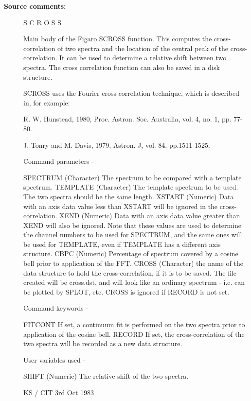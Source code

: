 \begin{description}
\item [\textbf{Source comments:}]
\begin{terminalv}
 S C R O S S

 Main body of the Figaro SCROSS function.  This computes
 the cross-correlation of two spectra and the location of the
 central peak of the cross-correlation.  It can be used to
 determine a relative shift between two spectra.  The cross
 correlation function can also be saved in a disk structure.

 SCROSS uses the Fourier cross-correlation technique, which is
 described in, for example:

   R. W. Hunstead, 1980, Proc. Astron. Soc. Australia, vol. 4, no. 1,
   pp. 77-80.

   J. Tonry and M. Davis, 1979, Astron. J, vol. 84, pp.1511-1525.

 Command parameters -

 SPECTRUM    (Character) The spectrum to be compared with
             a template spectrum.
 TEMPLATE    (Character) The template spectrum to be used.
             The two spectra should be the same length.
 XSTART      (Numeric) Data with an axis data value less than XSTART
             will be ignored in the cross-correlation.
 XEND        (Numeric) Data with an axis data value greater than XEND
             will also be ignored.  Note that these values are
             used to determine the channel numbers to be used
             for SPECTRUM, and the same ones will be used for
             TEMPLATE, even if TEMPLATE has a  different axis
             structure.
 CBPC        (Numeric) Percentage of spectrum covered by a cosine
             bell prior to application of the FFT.
 CROSS       (Character) the name of the data structure to hold
             the cross-correlation, if it is to be saved.
             The file created will be cross.dst, and will look
             like an ordinary spectrum - i.e. can be plotted by
             SPLOT, etc.  CROSS is ignored if RECORD is not
             set.

 Command keywords -

 FITCONT     If set, a continuum fit is performed on the two
             spectra prior to application of the cosine bell.
 RECORD      If set, the cross-correlation of the two spectra
             will be recorded as a new data structure.

 User variables used -

 SHIFT       (Numeric) The relative shift of the two spectra.

                                         KS / CIT 3rd Oct 1983
\end{terminalv}
\end{description}
